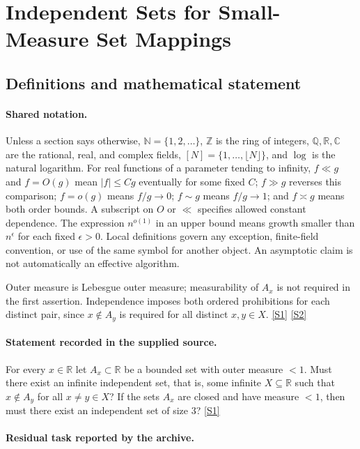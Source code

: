 \documentclass[11pt,a4paper]{article}
\newcommand{\N}{\mathbb{N}}
\newcommand{\Z}{\mathbb{Z}}
\newcommand{\Q}{\mathbb{Q}}
\newcommand{\R}{\mathbb{R}}
\newcommand{\C}{\mathbb{C}}
\newcommand{\sref}[2]{\hyperlink{source:#1:#2}{[S#2]}}
\begin{document}
\section{Independent Sets for Small-Measure Set Mappings}\label{statement}


\subsection{Definitions and mathematical statement}

\paragraph{Shared notation.}Unless a section says otherwise, $\N=\{1,2,\ldots\}$,
$\Z$ is the ring of integers, $\Q,\R,\C$ are the rational, real, and complex
fields, $[N]=\{1,\ldots,\lfloor N\rfloor\}$, and $\log$ is the natural
logarithm. For real functions of a parameter tending to infinity,
$f\ll g$ and $f=O(g)$ mean $|f|\leq Cg$ eventually for some fixed $C$;
$f\gg g$ reverses this comparison; $f=o(g)$ means $f/g\to0$;
$f\sim g$ means $f/g\to1$; and $f\asymp g$ means both order bounds.
A subscript on $O$ or $\ll$ specifies allowed constant dependence.
The expression $n^{o(1)}$ in an upper bound means growth smaller than
$n^\epsilon$ for each fixed $\epsilon>0$. Local definitions govern any
exception, finite-field convention, or use of the same symbol for another
object. An asymptotic claim is not automatically an effective algorithm.



Outer measure is Lebesgue outer measure; measurability of $A_x$ is not required in the first assertion. Independence imposes both ordered prohibitions for each distinct pair, since $x\notin A_y$ is required for all distinct $x,y\in X$. \sref{statement}{1} \sref{statement}{2}

\paragraph{Statement recorded in the supplied source.}
For every $x\in\mathbb{R}$ let $A_x\subset \mathbb{R}$ be a bounded set with outer measure $<1$. Must there exist an infinite independent set, that is, some infinite $X\subseteq \mathbb{R}$ such that $x\not\in A_y$ for all $x\neq y\in X$?
If the sets $A_x$ are closed and have measure $<1$, then must there exist an independent set of size $3$? \sref{statement}{1}

\paragraph{Residual task reported by the archive.}
\end{document}
